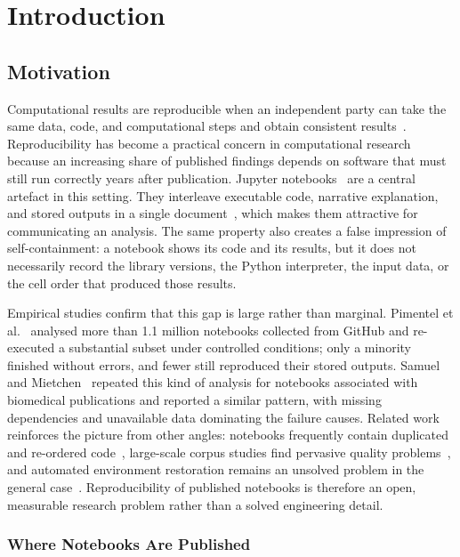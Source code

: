 \chapter{Introduction}
\label{chap:introduction}

\section{Motivation}
\label{sec:motivation}

Computational results are reproducible when an independent party can take the same data, code, and computational steps and obtain consistent results~\cite{nasem2019}. Reproducibility has become a practical concern in computational research because an increasing share of published findings depends on software that must still run correctly years after publication. Jupyter notebooks~\cite{kluyver2016} are a central artefact in this setting. They interleave executable code, narrative explanation, and stored outputs in a single document~\cite{nbformat}, which makes them attractive for communicating an analysis. The same property also creates a false impression of self-containment: a notebook shows its code and its results, but it does not necessarily record the library versions, the Python interpreter, the input data, or the cell order that produced those results.

Empirical studies confirm that this gap is large rather than marginal. Pimentel et al.~\cite{pimentel2019} analysed more than 1.1 million notebooks collected from GitHub and re-executed a substantial subset under controlled conditions; only a minority finished without errors, and fewer still reproduced their stored outputs. Samuel and Mietchen~\cite{samuel2024computational} repeated this kind of analysis for notebooks associated with biomedical publications and reported a similar pattern, with missing dependencies and unavailable data dominating the failure causes. Related work reinforces the picture from other angles: notebooks frequently contain duplicated and re-ordered code~\cite{koenzen2020duplication}, large-scale corpus studies find pervasive quality problems~\cite{psallidas2022datascience}, and automated environment restoration remains an unsolved problem in the general case~\cite{wang2020restoring}. Reproducibility of published notebooks is therefore an open, measurable research problem rather than a solved engineering detail.

\subsection*{Where Notebooks Are Published}


